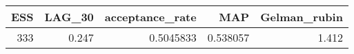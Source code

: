 \begin{longtable}{rrrrr}
\toprule
ESS & LAG\_30 & acceptance\_rate & MAP & Gelman\_rubin \\ 
\midrule
333 & 0.247 & 0.5045833 & 0.538057 & 1.412 \\ 
\bottomrule
\end{longtable}

